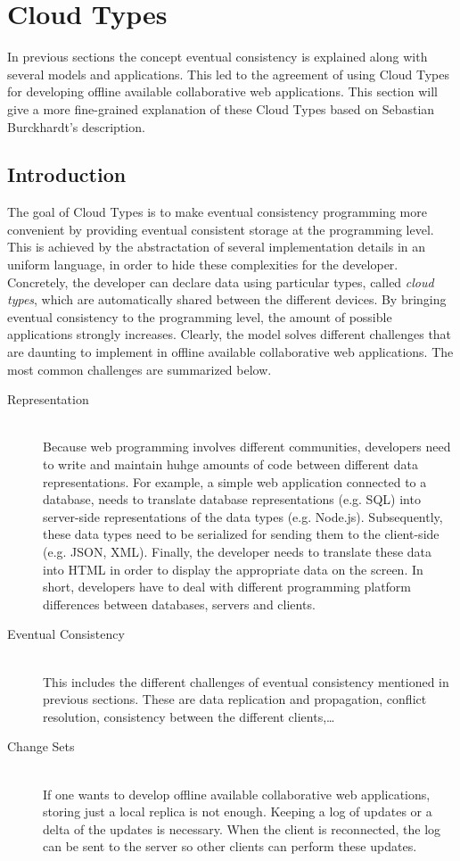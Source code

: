 \documentclass[a4paper,12pt]{report}
\begin{document}
\chapter{Cloud Types}\label{cha:CloudTypes} %

In previous sections the concept eventual consistency is explained along with several models and applications. This led to the agreement of using Cloud Types for developing offline available collaborative web applications. This section will give a more fine-grained explanation of these Cloud Types based on Sebastian Burckhardt's description.

\section{Introduction}\label{sec:Introduction}

The goal of Cloud Types is to make eventual consistency programming more convenient by providing eventual consistent storage at the programming level. This is achieved by the abstractation of several implementation details in an uniform language, in order to hide these complexities for the developer. Concretely, the developer can declare data using particular types, called \textit{cloud types}, which are automatically shared between the different devices. By bringing eventual consistency to the programming level, the amount of possible applications strongly increases. Clearly, the model solves different challenges that are daunting to implement in offline available collaborative web applications. The most common challenges are summarized below.

\begin{description}
 \item[Representation] \hfill \\Because web programming involves different communities, developers need to write and maintain huhge amounts of code between different data representations. For example, a simple web application connected to a database, needs to translate database representations (e.g. SQL) into server-side representations of the data types (e.g. Node.js). Subsequently, these data types need to be serialized for sending them to the client-side (e.g. JSON, XML). Finally, the developer needs to translate these data into HTML in order to display the appropriate data on the screen. In short, developers have to deal with different programming platform differences between databases, servers and clients. 
 \item[Eventual Consistency] \hfill \\This includes the different challenges of eventual consistency mentioned in previous sections. These are data replication and propagation, conflict resolution, consistency between the different clients,\ldots
 \item[Change Sets] \hfill \\If one wants to develop offline available collaborative web applications, storing just a local replica is not enough. Keeping a log of updates or a delta of the updates is necessary. When the client is reconnected, the log can be sent to the server so other clients can perform these updates.
\end{description}
\end{document}
